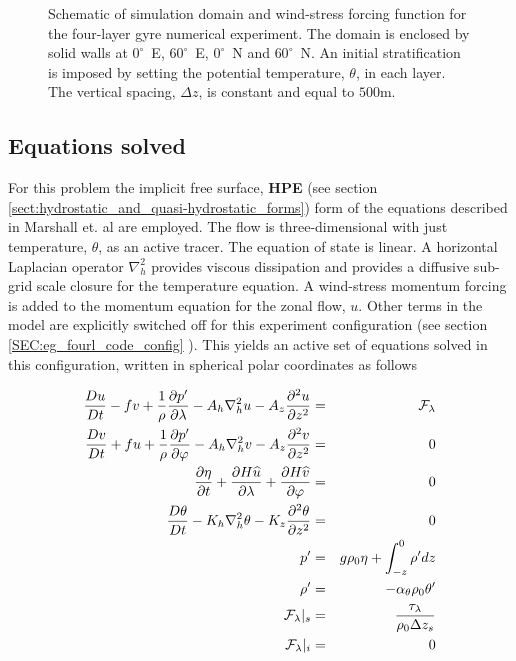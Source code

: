 \begin{figure}
\begin{center}
\end{center}
\caption{Schematic of simulation domain and wind-stress forcing function 
for the four-layer gyre numerical experiment. The domain is enclosed by solid
walls at $0^{\circ}$~E, $60^{\circ}$~E, $0^{\circ}$~N and $60^{\circ}$~N.
An initial stratification is 
imposed by setting the potential temperature, $\theta$, in each layer.
The vertical spacing, $\Delta z$, is constant and equal to $500$m.
}
\label{FIG:eg-fourlayer-simulation_config}
\end{figure}

\subsection{Equations solved}
\label{www:tutorials}
For this problem
the implicit free surface, {\bf HPE} (see section \ref{sect:hydrostatic_and_quasi-hydrostatic_forms}) form of the 
equations described in Marshall et. al \cite{marshall:97a} are
employed. The flow is three-dimensional with just temperature, $\theta$, as 
an active tracer.  The equation of state is linear.
A horizontal Laplacian operator $\nabla_{h}^2$ provides viscous
dissipation and provides a diffusive sub-grid scale closure for the 
temperature equation. A wind-stress momentum forcing is added to the momentum 
equation for the zonal flow, $u$. Other terms in the model
are explicitly switched off for this experiment configuration (see section
\ref{SEC:eg_fourl_code_config} ). This yields an active set of equations
solved in this configuration, written in spherical polar coordinates as 
follows

\begin{eqnarray}
\label{EQ:eg-fourlayer-model_equations}
\frac{Du}{Dt} - fv + 
  \frac{1}{\rho}\frac{\partial p^{\prime}}{\partial \lambda} - 
  A_{h}\nabla_{h}^2u - A_{z}\frac{\partial^{2}u}{\partial z^{2}} 
& = &
\cal{F}_{\lambda}
\\
\frac{Dv}{Dt} + fu + 
  \frac{1}{\rho}\frac{\partial p^{\prime}}{\partial \varphi} - 
  A_{h}\nabla_{h}^2v - A_{z}\frac{\partial^{2}v}{\partial z^{2}} 
& = &
0
\\
\frac{\partial \eta}{\partial t} + \frac{\partial H \widehat{u}}{\partial \lambda} +
\frac{\partial H \widehat{v}}{\partial \varphi}
&=&
0
\label{eq:fourl_example_continuity}
\\
\frac{D\theta}{Dt} -
 K_{h}\nabla_{h}^2\theta  - K_{z}\frac{\partial^{2}\theta}{\partial z^{2}} 
& = &
0
\label{eq:eg_fourl_theta}
\\
p^{\prime} & = &
g\rho_{0} \eta + \int^{0}_{-z}\rho^{\prime} dz
\\
\rho^{\prime} & = &- \alpha_{\theta}\rho_{0}\theta^{\prime}
\\
{\cal F}_{\lambda} |_{s} & = & \frac{\tau_{\lambda}}{\rho_{0}\Delta z_{s}}
\\
{\cal F}_{\lambda} |_{i} & = & 0
\end{eqnarray}

